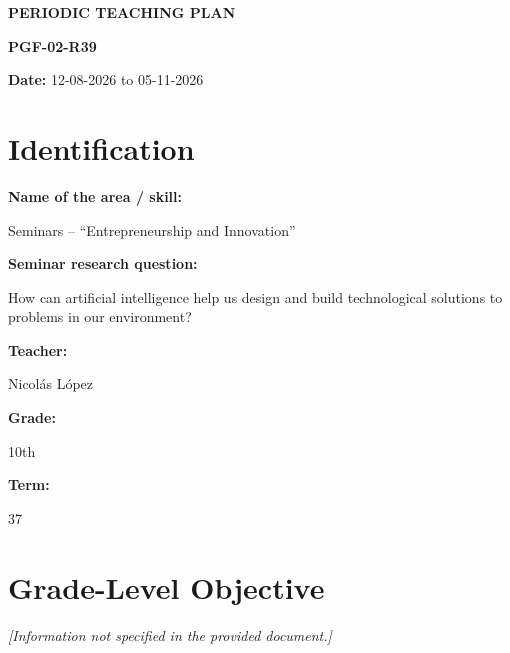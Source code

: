 \documentclass[12pt,a4paper]{article}
\newcommand{\placeholder}[1]{
	\textit{\textcolor{secondary}{[#1]}}
}
\begin{document}
	
	
	\begin{center}
		
		{\Large\bfseries\color{primary}
			PERIODIC TEACHING PLAN}
		
		\vspace{0.4cm}
		
		{\normalsize\bfseries PGF-02-R39}
		
		\vspace{0.3cm}
		
		{\normalsize
			\textbf{Date:} 12-08-2026 to 05-11-2026}
		
	\end{center}
	
	\vspace{0.8cm}
	
	\tableofcontents
	
	
	
	\section{Identification}
	
	\textbf{Name of the area / skill:}
	
	Seminars -- ``Entrepreneurship and Innovation''
	
	\textbf{Seminar research question:}
	
	How can artificial intelligence help us design and build technological solutions to problems in our environment?
	
	\textbf{Teacher:}
	
	Nicolás López
	
	\textbf{Grade:}
	
	10th
	
	\textbf{Term:}
	
	37
	
	
	\section{Grade-Level Objective}
	
	\placeholder{Information not specified in the provided document.}
	
\end{document}
